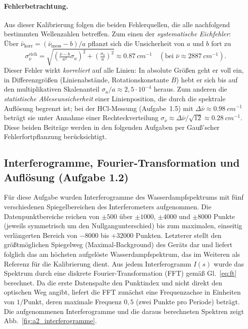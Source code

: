\documentclass[11pt,a4paper]{article}
\begin{document}
\paragraph{Fehlerbetrachtung.}
Aus dieser Kalibrierung folgen die beiden Fehlerquellen, die alle nachfolgend
bestimmten Wellenzahlen betreffen. Zum einen der \emph{systematische Eichfehler}:
Über $\bar\nu_\mathrm{korr}=(\bar\nu_\mathrm{mess}-b)/a$ pflanzt sich die
Unsicherheit von $a$ und $b$ fort zu
\begin{equation}
  \sigma_{\bar\nu}^\mathrm{eich}
  = \sqrt{\left(\tfrac{\bar\nu-b}{a^2}\sigma_a\right)^2+\left(\tfrac{\sigma_b}{a}\right)^2}
  \approx \SI{0.87}{cm^{-1}} \quad (\text{bei }\bar\nu\approx\SI{2887}{cm^{-1}}).
\end{equation}
Dieser Fehler wirkt \emph{korreliert} auf alle Linien: In absolute Größen geht er
voll ein, in Differenzgrößen (Linienabstände, Rotationskonstante $B$) hebt er
sich bis auf den multiplikativen Skalenanteil $\sigma_a/a\approx2{,}5\cdot10^{-4}$
heraus. Zum anderen die \emph{statistische Ableseunsicherheit} einer
Linienposition, die durch die spektrale Auflösung begrenzt ist; bei der
HCl-Messung (Aufgabe~1.5) mit $\Delta\bar\nu\approx\SI{0.98}{cm^{-1}}$ beträgt sie
unter Annahme einer Rechteckverteilung
$\sigma_{\bar\nu}\approx\Delta\bar\nu/\sqrt{12}\approx\SI{0.28}{cm^{-1}}$. Diese
beiden Beiträge werden in den folgenden Aufgaben per Gauß'scher
Fehlerfortpflanzung berücksichtigt.

\subsection{Interferogramme, Fourier-Transformation und Auflösung (Aufgabe 1.2)}
\label{sec:ftir_auswertung}

Für diese Aufgabe wurden Interferogramme des Wasserdampfspektrums mit fünf
verschiedenen Spiegelbereichen des Interferometers aufgenommen. Die
Datenpunktbereiche reichen von $\pm500$ über $\pm1000$, $\pm4000$ und $\pm8000$
Punkte (jeweils symmetrisch um den Nullgangunterschied) bis zum maximalen,
einseitig verlängerten Bereich von $-8000$ bis $+32000$ Punkten. Letzterer stellt
den größtmöglichen Spiegelweg (Maximal-Background) des Geräts dar und liefert
folglich das am höchsten aufgelöste Wasserdampfspektrum, das im Weiteren als
Referenz für die Kalibrierung dient. Aus jedem
Interferogramm $I(s)$ wurde das Spektrum durch eine diskrete
Fourier-Transformation (FFT) gemäß Gl.~\eqref{eq:ft} berechnet. Da die erste
Datenspalte den Punktindex und nicht direkt den optischen Weg angibt, liefert die
FFT zunächst eine Frequenzachse in Einheiten von $1/\text{Punkt}$, deren maximale
Frequenz $0{,}5$ (zwei Punkte pro Periode) beträgt. Die aufgenommenen
Interferogramme und die daraus berechneten Spektren zeigt
Abb.~\ref{fig:a2_interferogramme}.
\end{document}
